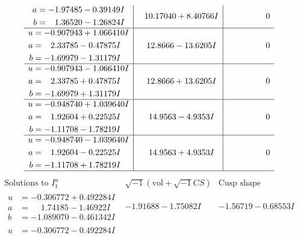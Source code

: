 \documentclass[1p]{elsarticle_modified}
\theoremstyle{definition}
\newcommand{\I}{\sqrt{-1}}
\begin{document}
$$\begin{array}{c|c|c}
\begin{aligned}
a &= -1.97485 - 0.39149 I \\
b &= \phantom{-}1.36520 - 1.26824 I\end{aligned}
 & \phantom{-}10.17040 + 8.40766 I & \phantom{-0.000000 } 0 \\ \hline\begin{aligned}
u &= -0.907943 + 1.066410 I \\
a &= \phantom{-}2.33785 - 0.47875 I \\
b &= -1.69979 - 1.31179 I\end{aligned}
 & \phantom{-}12.8666 - 13.6205 I & \phantom{-0.000000 } 0 \\ \hline\begin{aligned}
u &= -0.907943 - 1.066410 I \\
a &= \phantom{-}2.33785 + 0.47875 I \\
b &= -1.69979 + 1.31179 I\end{aligned}
 & \phantom{-}12.8666 + 13.6205 I & \phantom{-0.000000 } 0 \\ \hline\begin{aligned}
u &= -0.948740 + 1.039640 I \\
a &= \phantom{-}1.92604 + 0.22525 I \\
b &= -1.11708 - 1.78219 I\end{aligned}
 & \phantom{-}14.9563 - 4.9353 I & \phantom{-0.000000 } 0 \\ \hline\begin{aligned}
u &= -0.948740 - 1.039640 I \\
a &= \phantom{-}1.92604 - 0.22525 I \\
b &= -1.11708 + 1.78219 I\end{aligned}
 & \phantom{-}14.9563 + 4.9353 I & \phantom{-0.000000 } 0\\
 \hline 
 \end{array}$$\newpage$$\begin{array}{c|c|c}  
\text{Solutions to }I^u_{1}& \I (\text{vol} + \sqrt{-1}CS) & \text{Cusp shape}\\
 \hline 
\begin{aligned}
u &= -0.306772 + 0.492284 I \\
a &= \phantom{-}1.74185 - 1.46922 I \\
b &= -1.089070 - 0.461342 I\end{aligned}
 & -1.91688 - 1.75082 I & -1.56719 - 0.68553 I \\ \hline\begin{aligned}
u &= -0.306772 - 0.492284 I \\

\end{aligned}
\end{array}$$
\end{document}
